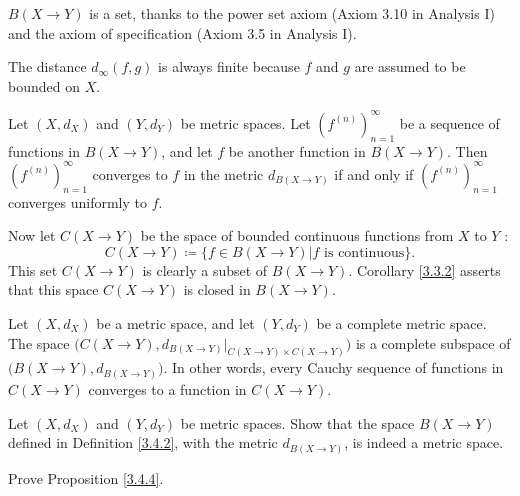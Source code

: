 \begin{note}
    \(B(X \to Y)\) is a set, thanks to the power set axiom (Axiom 3.10 in Analysis I) and the axiom of specification (Axiom 3.5 in Analysis I).
\end{note}

\begin{note}
    The distance \(d_\infty(f, g)\) is always finite because \(f\) and \(g\) are assumed to be bounded on \(X\).
\end{note}

\setcounter{theorem}{3}
\begin{proposition}\label{3.4.4}
    Let \((X, d_X)\) and \((Y, d_Y)\) be metric spaces.
    Let \((f^{(n)})_{n = 1}^\infty\) be a sequence of functions in \(B(X \to Y)\), and let \(f\) be another function in \(B(X \to Y)\).
    Then \((f^{(n)})_{n = 1}^\infty\) converges to \(f\) in the metric \(d_{B(X \to Y)}\) if and only if \((f^{(n)})_{n = 1}^\infty\) converges uniformly to \(f\).
\end{proposition}

\begin{note}
    Now let \(C(X \to Y)\) be the space of bounded continuous functions from \(X\) to \(Y\) :
    \[
        C(X \to Y) \coloneqq \{f \in B(X \to Y) | f \text{ is continuous}\}.
    \]
    This set \(C(X \to Y)\) is clearly a subset of \(B(X \to Y)\).
    Corollary \ref{3.3.2} asserts that this space \(C(X \to Y)\) is closed in \(B(X \to Y)\).
\end{note}

\begin{theorem}\label{3.4.5}
    Let \((X, d_X)\) be a metric space, and let \((Y, d_Y)\) be a complete metric space.
    The space \(\big(C(X \to Y), d_{B(X \to Y)}|_{C(X \to Y) \times C(X \to Y)}\big)\) is a complete subspace of \(\big(B(X \to Y), d_{B(X \to Y)}\big)\).
    In other words, every Cauchy sequence of functions in \(C(X \to Y)\) converges to a function in \(C(X \to Y)\).
\end{theorem}

\exercisesection

\begin{exercise}\label{ex 3.4.1}
    Let \((X, d_X)\) and \((Y, d_Y)\) be metric spaces.
    Show that the space \(B(X \to Y)\) defined in Definition \ref{3.4.2}, with the metric \(d_{B(X \to Y)}\), is indeed a metric space.
\end{exercise}

\begin{exercise}\label{ex 3.4.2}
    Prove Proposition \ref{3.4.4}.
\end{exercise}

